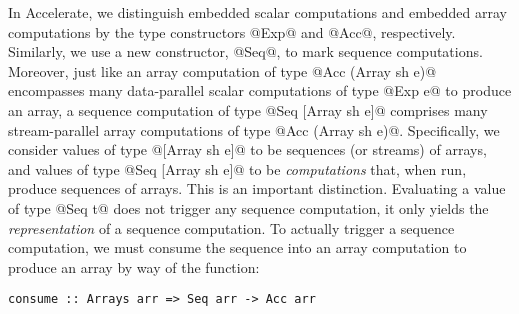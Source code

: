 %
%
%


In Accelerate, we distinguish embedded scalar computations and embedded array computations by the type constructors @Exp@ and @Acc@, respectively. Similarly, we use a new constructor, @Seq@, to mark sequence computations. Moreover, just like an array computation of type @Acc (Array sh e)@ encompasses many data-parallel scalar computations of type @Exp e@ to produce an array, a sequence computation of type @Seq [Array sh e]@ comprises many stream-parallel array computations of type @Acc (Array sh e)@. Specifically, we consider values of type @[Array sh e]@ to be sequences (or streams) of arrays, and values of type @Seq [Array sh e]@ to be \emph{computations} that, when run, produce sequences of arrays. This is an important distinction. Evaluating a value of type @Seq t@ does not trigger any sequence computation, it only yields the \emph{representation} of a sequence computation. To actually trigger a sequence computation, we must consume the sequence into an array computation to produce an array by way of the function:
%
\begin{lstlisting}
consume :: Arrays arr => Seq arr -> Acc arr
\end{lstlisting}

